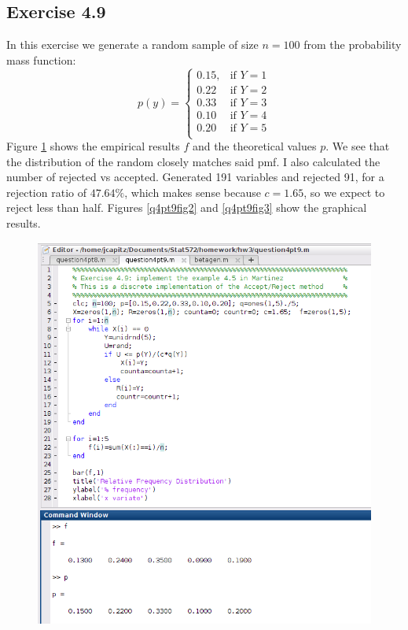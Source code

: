 \documentclass[12pt,a4paper]{article}
\begin{document}
\subsection*{Exercise 4.9}

In this exercise we generate a random sample of size $n=100$ from the probability mass function:
\[p(y)=\begin{cases}
0.15, & \text{if } Y=1\\
0.22 & \text{if } Y=2\\
0.33 & \text{if } Y=3\\
0.10 & \text{if } Y=4\\
0.20 & \text{if } Y=5\\
\end{cases}\]
Figure \ref{q4pt9fig1} shows the empirical results $f$ and the theoretical values $p$. We see that the distribution of the random closely matches said pmf. I also calculated the number of rejected vs accepted. Generated 191 variables and rejected 91, for a rejection ratio of $47.64\%$, which makes sense because $c=1.65$, so we expect to reject less than half. Figures \ref{q4pt9fig2} and \ref{q4pt9fig3} show the graphical results.


\begin{figure}[ht!]
\begin{center}
\includegraphics[scale=.60]{q4pt9_code.png}
\caption{}
\label{q4pt9fig1}
\end{center}
\end{figure}
\FloatBarrier
\end{document}
